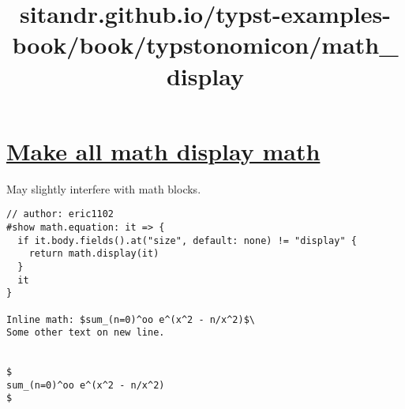 \title{sitandr.github.io/typst-examples-book/book/typstonomicon/math_display}

\section{\texorpdfstring{\hyperref[make-all-math-display-math]{Make all
math display
math}}{Make all math display math}}\label{make-all-math-display-math}

May slightly interfere with math blocks.

\begin{verbatim}
// author: eric1102
#show math.equation: it => {
  if it.body.fields().at("size", default: none) != "display" {
    return math.display(it)
  }
  it
}

Inline math: $sum_(n=0)^oo e^(x^2 - n/x^2)$\
Some other text on new line.


$
sum_(n=0)^oo e^(x^2 - n/x^2)
$
\end{verbatim}

\pandocbounded{}
